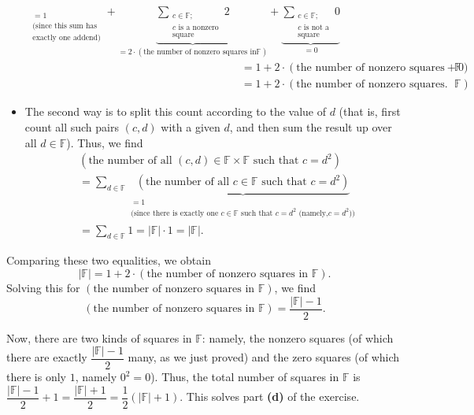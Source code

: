 \documentclass[paper=a4, fontsize=12pt]{scrartcl}%
\let\sumnonlimits\sum
\renewcommand{\sum}{\sumnonlimits\limits}
\theoremstyle{plainsl}
\theoremstyle{definition}
\theoremstyle{remark}
\begin{document}
\begin{itemize}
\begin{align*}
_{\substack{=1\\\text{(since this sum has}\\\text{exactly one addend)}%
}}+\underbrace{\sum_{\substack{c\in\mathbb{F};\\c\text{ is a nonzero}%
\\\text{square}}}2}_{=2\cdot\left(  \text{the number of nonzero squares in
}\mathbb{F}\right)  }+\underbrace{\sum_{\substack{c\in\mathbb{F};\\c\text{ is
not a}\\\text{square}}}0}_{=0}\\
&  =1+2\cdot\left(  \text{the number of nonzero squares in }\mathbb{F}\right)
+0\\
&  =1+2\cdot\left(  \text{the number of nonzero squares in }\mathbb{F}\right)
.
\end{align*}


\item The second way is to split this count according to the value of $d$
(that is, first count all such pairs $\left(  c,d\right)  $ with a given $d$,
and then sum the result up over all $d\in\mathbb{F}$). Thus, we find%
\begin{align*}
&  \left(  \text{the number of all }\left(  c,d\right)  \in\mathbb{F}%
\times\mathbb{F}\text{ such that }c=d^{2}\right) \\
&  =\sum_{d\in\mathbb{F}}\underbrace{\left(  \text{the number of all }%
c\in\mathbb{F}\text{ such that }c=d^{2}\right)  }_{\substack{=1\\\text{(since
there is exactly one }c\in\mathbb{F}\text{ such that }c=d^{2}\text{ (namely,
}c=d^{2}\text{))}}}\\
&  =\sum_{d\in\mathbb{F}}1=\left\vert \mathbb{F}\right\vert \cdot1=\left\vert
\mathbb{F}\right\vert .
\end{align*}

\end{itemize}

Comparing these two equalities, we obtain%
\[
\left\vert \mathbb{F}\right\vert =1+2\cdot\left(  \text{the number of nonzero
squares in }\mathbb{F}\right)  .
\]
Solving this for $\left(  \text{the number of nonzero squares in }%
\mathbb{F}\right)  $, we find%
\[
\left(  \text{the number of nonzero squares in }\mathbb{F}\right)
=\dfrac{\left\vert \mathbb{F}\right\vert -1}{2}.
\]


Now, there are two kinds of squares in $\mathbb{F}$: namely, the nonzero
squares (of which there are exactly $\dfrac{\left\vert \mathbb{F}\right\vert
-1}{2}$ many, as we just proved) and the zero squares (of which there is only
$1$, namely $0^{2}=0$). Thus, the total number of squares in $\mathbb{F}$ is
$\dfrac{\left\vert \mathbb{F}\right\vert -1}{2}+1=\dfrac{\left\vert
\mathbb{F}\right\vert +1}{2}=\dfrac{1}{2}\left(  \left\vert \mathbb{F}%
\right\vert +1\right)  $. This solves part \textbf{(d)} of the exercise.
\end{document}
